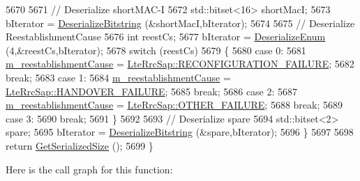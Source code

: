\begin{DoxyCode}
5670 
5671       \textcolor{comment}{// Deserialize shortMAC-I}
5672       std::bitset<16> shortMacI;
5673       bIterator = \hyperlink{classns3_1_1Asn1Header_adb34498b05e8562fba5d40f49578968d}{DeserializeBitstring} (&shortMacI,bIterator);
5674 
5675       \textcolor{comment}{// Deserialize ReestablishmentCause}
5676       \textcolor{keywordtype}{int} reestCs;
5677       bIterator = \hyperlink{classns3_1_1Asn1Header_a4fcc253e0eec3483c775b005c1875f2d}{DeserializeEnum} (4,&reestCs,bIterator);
5678       \textcolor{keywordflow}{switch} (reestCs)
5679         \{
5680         \textcolor{keywordflow}{case} 0:
5681           \hyperlink{classns3_1_1RrcConnectionReestablishmentRequestHeader_a11c01646910bd88dcd441cde3532fd5a}{m\_reestablishmentCause} = 
      \hyperlink{classns3_1_1LteRrcSap_ae749c5fa44cab5b732095b42f4845659a7e68f0d2424d23331a5977b93d16d35c}{LteRrcSap::RECONFIGURATION\_FAILURE};
5682           \textcolor{keywordflow}{break};
5683         \textcolor{keywordflow}{case} 1:
5684           \hyperlink{classns3_1_1RrcConnectionReestablishmentRequestHeader_a11c01646910bd88dcd441cde3532fd5a}{m\_reestablishmentCause} = 
      \hyperlink{classns3_1_1LteRrcSap_ae749c5fa44cab5b732095b42f4845659ae9c245f6dd8ac20452aebb1ac058fe62}{LteRrcSap::HANDOVER\_FAILURE};
5685           \textcolor{keywordflow}{break};
5686         \textcolor{keywordflow}{case} 2:
5687           \hyperlink{classns3_1_1RrcConnectionReestablishmentRequestHeader_a11c01646910bd88dcd441cde3532fd5a}{m\_reestablishmentCause} = 
      \hyperlink{classns3_1_1LteRrcSap_ae749c5fa44cab5b732095b42f4845659a52adabb79ff33ce665f3638884aa6210}{LteRrcSap::OTHER\_FAILURE};
5688           \textcolor{keywordflow}{break};
5689         \textcolor{keywordflow}{case} 3:
5690           \textcolor{keywordflow}{break};
5691         \}
5692 
5693       \textcolor{comment}{// Deserialize spare}
5694       std::bitset<2> spare;
5695       bIterator = \hyperlink{classns3_1_1Asn1Header_adb34498b05e8562fba5d40f49578968d}{DeserializeBitstring} (&spare,bIterator);
5696     \}
5697 
5698   \textcolor{keywordflow}{return} \hyperlink{classns3_1_1Asn1Header_a18a67eb7869c5784f59d197bbd76a74f}{GetSerializedSize} ();
5699 \}
\end{DoxyCode}


Here is the call graph for this function\+:


